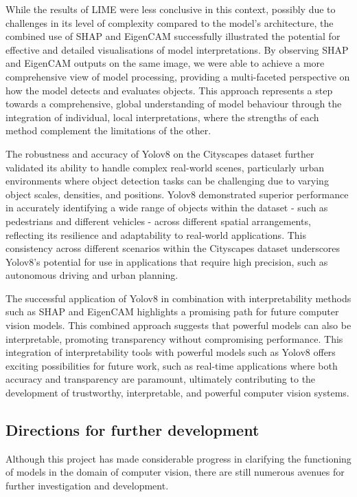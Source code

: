While the results of LIME were less conclusive in this context, possibly due to challenges in its level of complexity compared to the model's architecture, the combined use of SHAP and EigenCAM successfully illustrated the potential for effective and detailed visualisations of model interpretations.
By observing SHAP and EigenCAM outputs on the same image, we were able to achieve a more comprehensive view of model processing, providing a multi-faceted perspective on how the model detects and evaluates objects.
This approach represents a step towards a comprehensive, global understanding of model behaviour through the integration of individual, local interpretations, where the strengths of each method complement the limitations of the other.

The robustness and accuracy of Yolov8 on the Cityscapes dataset further validated its ability to handle complex real-world scenes, particularly urban environments where object detection tasks can be challenging due to varying object scales, densities, and positions. Yolov8 demonstrated superior performance in accurately identifying a wide range of objects within the dataset - such as pedestrians and different vehicles - across different spatial arrangements, reflecting its resilience and adaptability to real-world applications.
This consistency across different scenarios within the Cityscapes dataset underscores Yolov8's potential for use in applications that require high precision, such as autonomous driving and urban planning.

The successful application of Yolov8 in combination with interpretability methods such as SHAP and EigenCAM highlights a promising path for future computer vision models.
This combined approach suggests that powerful models can also be interpretable, promoting transparency without compromising performance.
This integration of interpretability tools with powerful models such as Yolov8 offers exciting possibilities for future work, such as real-time applications where both accuracy and transparency are paramount, ultimately contributing to the development of trustworthy, interpretable, and powerful computer vision systems.

\subsection{Directions for further development}\label{subsec:dircetions-for-further-development}

Although this project has made considerable progress in clarifying the functioning of models in the domain of computer vision, there are still numerous avenues for further investigation and development.

